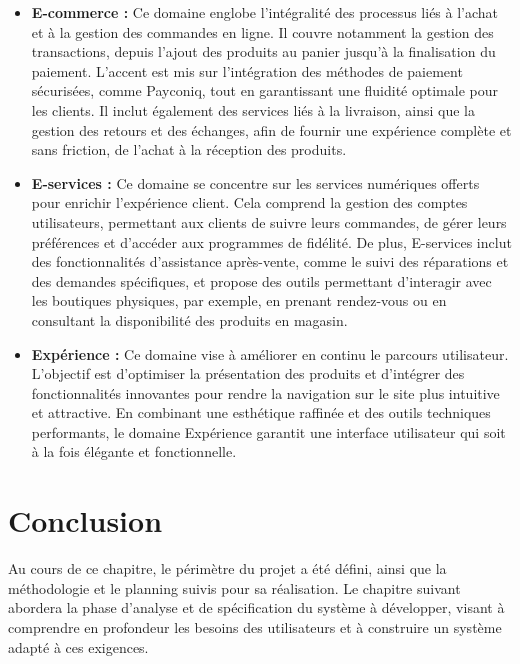 \begin{itemize}
    \item \textbf{E-commerce :} Ce domaine englobe l'intégralité des processus liés à l'achat et à la gestion des commandes en ligne. Il couvre notamment la gestion des transactions, depuis l'ajout des produits au panier jusqu'à la finalisation du paiement. L'accent est mis sur l'intégration des méthodes de paiement sécurisées, comme Payconiq, tout en garantissant une fluidité optimale pour les clients. Il inclut également des services liés à la livraison, ainsi que la gestion des retours et des échanges, afin de fournir une expérience complète et sans friction, de l'achat à la réception des produits.
    \item \textbf{E-services :} Ce domaine se concentre sur les services numériques offerts pour enrichir l'expérience client. Cela comprend la gestion des comptes utilisateurs, permettant aux clients de suivre leurs commandes, de gérer leurs préférences et d'accéder aux programmes de fidélité. De plus, E-services inclut des fonctionnalités d'assistance après-vente, comme le suivi des réparations et des demandes spécifiques, et propose des outils permettant d'interagir avec les boutiques physiques, par exemple, en prenant rendez-vous ou en consultant la disponibilité des produits en magasin.
    \item \textbf{Expérience :} Ce domaine vise à améliorer en continu le parcours utilisateur. L'objectif est d'optimiser la présentation des produits et d'intégrer des fonctionnalités innovantes pour rendre la navigation sur le site plus intuitive et attractive. En combinant une esthétique raffinée et des outils techniques performants, le domaine Expérience garantit une interface utilisateur qui soit à la fois élégante et fonctionnelle.
\end{itemize}



\section*{Conclusion}
Au cours de ce chapitre, le périmètre du projet a été défini, ainsi que la méthodologie et le planning suivis pour sa réalisation. Le chapitre suivant abordera la phase d’analyse et de spécification du système à développer, visant à comprendre en profondeur les besoins des utilisateurs et à construire un système adapté à ces exigences.







